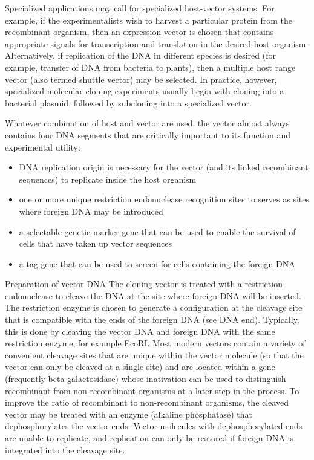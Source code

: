 Specialized applications may call for specialized host-vector systems. For example, if the experimentalists wish to harvest a particular protein from the recombinant organism, then an expression vector is chosen that contains appropriate signals for transcription and translation in the desired host organism. Alternatively, if replication of the DNA in different species is desired (for example, transfer of DNA from bacteria to plants), then a multiple host range vector (also termed shuttle vector) may be selected. In practice, however, specialized molecular cloning experiments usually begin with cloning into a bacterial plasmid, followed by subcloning into a specialized vector.

Whatever combination of host and vector are used, the vector almost always contains four DNA segments that are critically important to its function and experimental utility:

\begin{itemize}
\tightlist
\item
  DNA replication origin is necessary for the vector (and its linked recombinant sequences) to replicate inside the host organism
\item
  one or more unique restriction endonuclease recognition sites to serves as sites where foreign DNA may be introduced
\item
  a selectable genetic marker gene that can be used to enable the survival of cells that have taken up vector sequences
\item
  a tag gene that can be used to screen for cells containing the foreign DNA
\end{itemize}

Preparation of vector DNA
The cloning vector is treated with a restriction endonuclease to cleave the DNA at the site where foreign DNA will be inserted. The restriction enzyme is chosen to generate a configuration at the cleavage site that is compatible with the ends of the foreign DNA (see DNA end). Typically, this is done by cleaving the vector DNA and foreign DNA with the same restriction enzyme, for example EcoRI. Most modern vectors contain a variety of convenient cleavage sites that are unique within the vector molecule (so that the vector can only be cleaved at a single site) and are located within a gene (frequently beta-galactosidase) whose inativation can be used to distinguish recombinant from non-recombinant organisms at a later step in the process. To improve the ratio of recombinant to non-recombinant organisms, the cleaved vector may be treated with an enzyme (alkaline phosphatase) that dephosphorylates the vector ends. Vector molecules with dephosphorylated ends are unable to replicate, and replication can only be restored if foreign DNA is integrated into the cleavage site.

